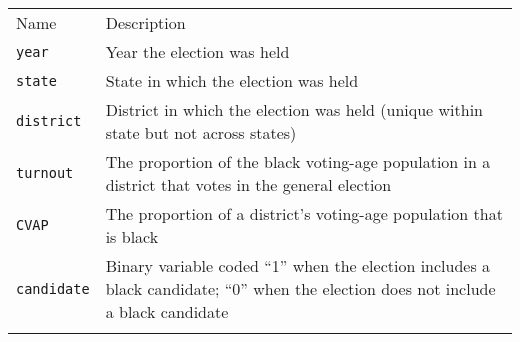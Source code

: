 \documentclass[]{article}
\begin{document}
\begin{longtable}[c]{@{}ll@{}}
\toprule\addlinespace
\begin{minipage}[b]{0.24\columnwidth}\raggedright
Name
\end{minipage} & \begin{minipage}[b]{0.71\columnwidth}\raggedright
Description
\end{minipage}
\\\addlinespace
\midrule\endhead
\begin{minipage}[t]{0.24\columnwidth}\raggedright
\texttt{year}
\end{minipage} & \begin{minipage}[t]{0.71\columnwidth}\raggedright
Year the election was held
\end{minipage}
\\\addlinespace
\begin{minipage}[t]{0.24\columnwidth}\raggedright
\texttt{state}
\end{minipage} & \begin{minipage}[t]{0.71\columnwidth}\raggedright
State in which the election was held
\end{minipage}
\\\addlinespace
\begin{minipage}[t]{0.24\columnwidth}\raggedright
\texttt{district}
\end{minipage} & \begin{minipage}[t]{0.71\columnwidth}\raggedright
District in which the election was held (unique within state but not
across states)
\end{minipage}
\\\addlinespace
\begin{minipage}[t]{0.24\columnwidth}\raggedright
\texttt{turnout}
\end{minipage} & \begin{minipage}[t]{0.71\columnwidth}\raggedright
The proportion of the black voting-age population in a district that
votes in the general election
\end{minipage}
\\\addlinespace
\begin{minipage}[t]{0.24\columnwidth}\raggedright
\texttt{CVAP}
\end{minipage} & \begin{minipage}[t]{0.71\columnwidth}\raggedright
The proportion of a district's voting-age population that is black
\end{minipage}
\\\addlinespace
\begin{minipage}[t]{0.24\columnwidth}\raggedright
\texttt{candidate}
\end{minipage} & \begin{minipage}[t]{0.71\columnwidth}\raggedright
Binary variable coded ``1'' when the election includes a black
candidate; ``0'' when the election does not include a black candidate
\end{minipage}
\\\addlinespace
\bottomrule
\end{longtable}
\end{document}

